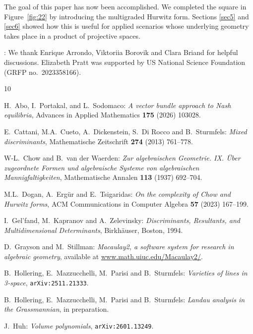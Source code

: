 \documentclass[12pt]{article}
\theoremstyle{definition}
\begin{document}
The goal of this paper has now been accomplished.
We completed the square in Figure~\ref{fig:22}
by introducing the multigraded Hurwitz form.
Sections \ref{sec5} and \ref{sec6} showed 
how this is useful for applied scenarios 
whose underlying geometry takes place in
a product of projective spaces.


\bigskip \bigskip
\bigskip 

:
We thank
Enrique Arrondo, Viktoriia Borovik and 
Clara Briand for helpful discussions.
Elizabeth Pratt was supported by US National Science Foundation (GRFP no.~2023358166). 


\bigskip \medskip

\begin{thebibliography}{10}
\begin{small}
\setlength{\itemsep}{-0.7mm}
		
 H.~Abo, I.~Portakal, and L.~Sodomaco: {\em A vector bundle approach to Nash equilibria}, Advances in Applied Mathematics {\bf 175} (2026) 103028.

E.~Cattani, M.A.~Cueto, A.~Dickenstein, S.~Di Rocco and B.~Sturmfels:
{\em Mixed discriminants}, Mathematische Zeitschrift {\bf 274} (2013) 761--778.

 W-L.~Chow and B.~van der Waerden: {\em Zur algebraischen Geometrie. IX. 
\"Uber zugeordnete Formen und algebraische Systeme von algebraischen Mannigfaltigkeiten},
Mathematische Annalen {\bf 113} (1937) 692--704.

 M.L.~Dogan, A.~Erg\"ur and E.~Tsigaridas:
{\em On the complexity of Chow and Hurwitz forms},
ACM Communications in Computer Algebra {\bf 57} (2023) 167--199.

I.~Gel'fand, M.~Kapranov and A.~Zelevinsky: {\em Discriminants, Resultants, and Multidimensional Determinants}, 
Birkh\"auser, Boston, 1994.

 D.~Grayson and M.~Stillman:
{\em Macaulay2, a software system for research in algebraic geometry},
available at \url{www.math.uiuc.edu/Macaulay2/}.

B.~Hollering, E.~Mazzucchelli, M.~Parisi and B.~Sturmfels:
{\em Varieties of lines in 3-space}, {\tt arXiv:2511.21333}.


B.~Hollering, E.~Mazzucchelli, M.~Parisi and B.~Sturmfels:
{\em Landau analysis in the Grassmannian}, in preparation.

J.~Huh: {\em Volume polynomials}, {\tt arXiv:2601.13249}.


\end{small}
\end{thebibliography}
\end{document}

